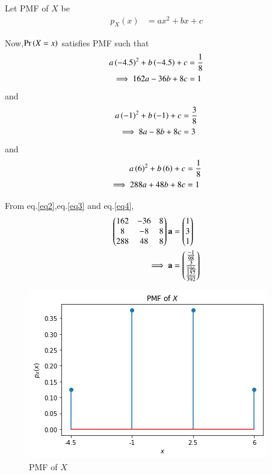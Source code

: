 \documentclass[journal,12pt,twocolumn]{IEEEtran}
\begin{document}
Let PMF of $X$ be
\begin{align}
    p_{X}(x) &= ax^2+bx+c
\end{align}

Now,$\Pr\left(X=x\right)$ satisfies PMF such that
\begin{align}
    a\left(-4.5\right)^2+b\left(-4.5\right)+c &= \frac{1}{8} \\
    \implies 162a-36b+8c &= 1 \label{eq2}
\end{align}
and
\begin{align}
    a\left(-1\right)^2+b\left(-1\right)+c &= \frac{3}{8} \\
    \implies 8a-8b+8c &= 3 \label{eq3}
\end{align}
and
\begin{align}
    a\left(6\right)^2+b\left(6\right)+c &= \frac{1}{8} \\
    \implies 288a+48b+8c &= 1 \label{eq4}
\end{align}

From eq.\eqref{eq2},eq.\eqref{eq3} and eq.\eqref{eq4},
\begin{align}
    \begin{pmatrix}162 & -36 & 8 \\ 8 & -8 & 8 \\288 & 48 & 8\end{pmatrix}\mathbf{a} &= \begin{pmatrix}1 \\ 3 \\ 1\end{pmatrix} \\
    \implies \mathbf{a} &= \begin{pmatrix}\frac{-1}{98} \\ \frac{3}{196} \\ \frac{157}{392} \end{pmatrix}
\end{align}

\begin{figure}[!ht]
\centering
\includegraphics[width=\columnwidth]{Figure14}
\caption{PMF of $X$}
\label{fig:fig1}	
\end{figure}
\end{document}
